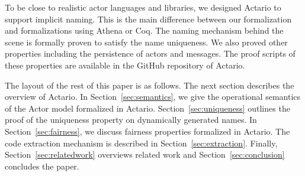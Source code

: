 To be close to realistic actor languages and libraries, we designed
Actario to support implicit naming. This is the main difference between
our formalization and formalizations using Athena\cite{Musser:2013aa}
or Coq\cite{Garnock-Jones:2014}. The naming mechanism behind the scene
is formally proven to satisfy the name uniqueness.  We also proved other
properties including the persistence of actors and messages.  The proof
scripts of these properties are available in the GitHub repository of
Actario\cite{Actario}.






The layout of the rest of this paper is as follows.
The next section describes the overview of Actario.
In Section~\ref{sec:semantics}, we give the operational semantics of the Actor model formalized in Actario.
Section~\ref{sec:uniqueness} outlines the proof of the uniqueness property on dynamically generated names.
In Section~\ref{sec:fairness}, we discuss fairness properties formalized in Actario.
The code extraction mechanism is described in Section~\ref{sec:extraction}.
Finally, Section~\ref{sec:relatedwork} overviews related work and Section~\ref{sec:conclusion} concludes the paper.

